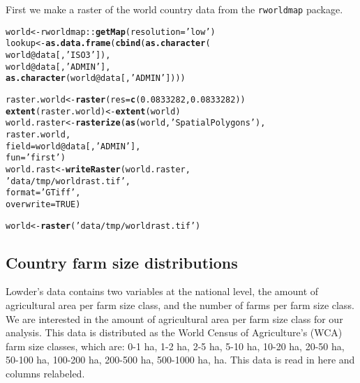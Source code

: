 \documentclass{article}\usepackage[]{graphicx}\usepackage[]{xcolor}
\makeatletter
\newcommand{\hlnum}[1]{\textcolor[rgb]{0.686,0.059,0.569}{#1}}%
\newcommand{\hlstr}[1]{\textcolor[rgb]{0.192,0.494,0.8}{#1}}%
\newcommand{\hlopt}[1]{\textcolor[rgb]{0,0,0}{#1}}%
\newcommand{\hlstd}[1]{\textcolor[rgb]{0.345,0.345,0.345}{#1}}%
\newcommand{\hlkwb}[1]{\textcolor[rgb]{0.69,0.353,0.396}{#1}}%
\newcommand{\hlkwc}[1]{\textcolor[rgb]{0.333,0.667,0.333}{#1}}%
\newcommand{\hlkwd}[1]{\textcolor[rgb]{0.737,0.353,0.396}{\textbf{#1}}}%
\newenvironment{kframe}{%
 \def\at@end@of@kframe{}%
 \ifinner\ifhmode%
  \def\at@end@of@kframe{\end{minipage}}%
  \begin{minipage}{\columnwidth}%
 \fi\fi%
 \def\FrameCommand##1{\hskip\@totalleftmargin \hskip-\fboxsep
 \colorbox{shadecolor}{##1}\hskip-\fboxsep
     \hskip-\linewidth \hskip-\@totalleftmargin \hskip\columnwidth}%
 \MakeFramed {\advance\hsize-\width
   \@totalleftmargin\z@ \linewidth\hsize
   \@setminipage}}%
 {\par\unskip\endMakeFramed%
 \at@end@of@kframe}
\newenvironment{knitrout}{}{} %
\makeatother
\begin{document}
First we make a raster of the world country data from the \texttt{rworldmap} package.
\begin{knitrout}
\color{fgcolor}\begin{kframe}
\begin{alltt}
\hlstd{world}  \hlkwb{<-} \hlstd{rworldmap}\hlopt{::}\hlkwd{getMap}\hlstd{(}\hlkwc{resolution} \hlstd{=} \hlstr{'low'}\hlstd{)}
\hlstd{lookup} \hlkwb{<-} \hlkwd{as.data.frame}\hlstd{(}\hlkwd{cbind}\hlstd{(}\hlkwd{as.character}\hlstd{(}
  \hlstd{world}\hlopt{@}\hlkwc{data}\hlstd{[,}\hlstr{'ISO3'}\hlstd{]),}
  \hlstd{world}\hlopt{@}\hlkwc{data}\hlstd{[,}\hlstr{'ADMIN'}\hlstd{],}
  \hlkwd{as.character}\hlstd{(world}\hlopt{@}\hlkwc{data}\hlstd{[,}\hlstr{'ADMIN'}\hlstd{])))}

\hlstd{raster.world} \hlkwb{<-} \hlkwd{raster}\hlstd{(}\hlkwc{res} \hlstd{=} \hlkwd{c}\hlstd{(}\hlnum{0.0833282}\hlstd{,} \hlnum{0.0833282}\hlstd{))}
\hlkwd{extent}\hlstd{(raster.world)} \hlkwb{<-} \hlkwd{extent}\hlstd{(world)}
\hlstd{world.raster} \hlkwb{<-} \hlkwd{rasterize}\hlstd{(}\hlkwd{as}\hlstd{(world,} \hlstr{'SpatialPolygons'}\hlstd{),}
                          \hlstd{raster.world,}
                          \hlkwc{field} \hlstd{= world}\hlopt{@}\hlkwc{data}\hlstd{[,} \hlstr{'ADMIN'}\hlstd{],}
                          \hlkwc{fun}   \hlstd{=} \hlstr{'first'}\hlstd{)}
\hlstd{world.rast} \hlkwb{<-} \hlkwd{writeRaster}\hlstd{(world.raster,}
                          \hlstr{'data/tmp/worldrast.tif'}\hlstd{,}
                          \hlkwc{format}    \hlstd{=} \hlstr{'GTiff'}\hlstd{,}
                          \hlkwc{overwrite} \hlstd{=} \hlnum{TRUE}\hlstd{)}

\hlstd{world}  \hlkwb{<-} \hlkwd{raster}\hlstd{(}\hlstr{'data/tmp/worldrast.tif'}\hlstd{)}
\end{alltt}
\end{kframe}
\end{knitrout}

\subsection{Country farm size distributions}

Lowder's data contains two variables at the national level, the amount of agricultural area per farm size class, and the number of farms per farm size class. We are interested in the amount of agricultural area per farm size class for our analysis. This data is distributed as the World Census of Agriculture's (WCA) farm size classes, which are: 0-1 ha, 1-2 ha, 2-5 ha, 5-10 ha, 10-20 ha, 20-50 ha, 50-100 ha, 100-200 ha, 200-500 ha, 500-1000 ha,  ha. This data is read in here and columns relabeled.
\end{document}
